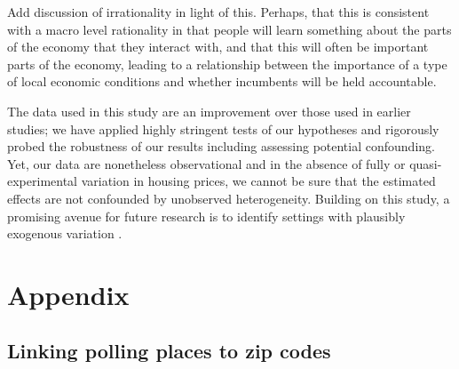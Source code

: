 \documentclass[12pt,a4paper]{article}
\begin{document}
	Add discussion of irrationality in light of this. Perhaps, that this is consistent with a macro level rationality in that people will learn something about the parts of the economy that they interact with, and that this will often be important parts of the economy, leading to a relationship between the importance of a type of local economic conditions and whether incumbents will be held accountable.
	
	The data used in this study are an improvement over those used in earlier studies; we have applied highly stringent tests of our hypotheses and rigorously probed the robustness of our results including assessing potential confounding. Yet, our data are nonetheless observational and in the absence of fully or quasi-experimental variation in housing prices, we cannot be sure that the estimated effects are not confounded by unobserved heterogeneity. Building on this study, a promising avenue for future research is to identify settings with plausibly exogenous variation \citep[cf.]{jerzak2016property}.
	
	
	
	
	
	
	
	
	
	
	
	\clearpage
	
	\singlespacing
	
	
	
	
	\newpage
	
	\appendix
	\section*{Appendix}
		\onehalfspacing
	\renewcommand{\thesubsection}{\Alph{subsection}}
	\renewcommand{\thetable}{\Alph{subsection}\arabic{table}}
	\renewcommand{\thefigure}{\Alph{subsection}\arabic{figure}}
	
	\localtableofcontents

	
	\newpage
	
	\subsection{Linking polling places to zip codes}\label{app_linking}
	
\end{document}
